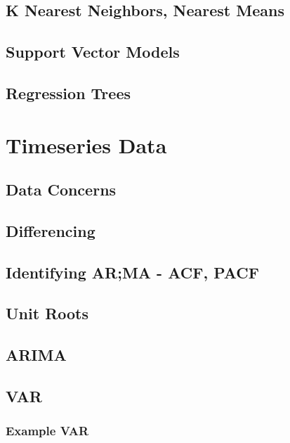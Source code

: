 \documentclass[12pt]{article}\usepackage[]{graphicx}\usepackage[]{color}
\begin{document}
\begin{flushleft}
\subsection{K Nearest Neighbors, Nearest Means}

\subsection{Support Vector Models}

\subsection{Regression Trees}



\clearpage
\section{Timeseries Data}

\subsection{Data Concerns}

\subsection{Differencing}

\subsection{Identifying AR;MA - ACF, PACF}

\subsection{Unit Roots}

\subsection{ARIMA}

\subsection{VAR}

\subsubsection{Example VAR}


\end{flushleft}
\end{document}
